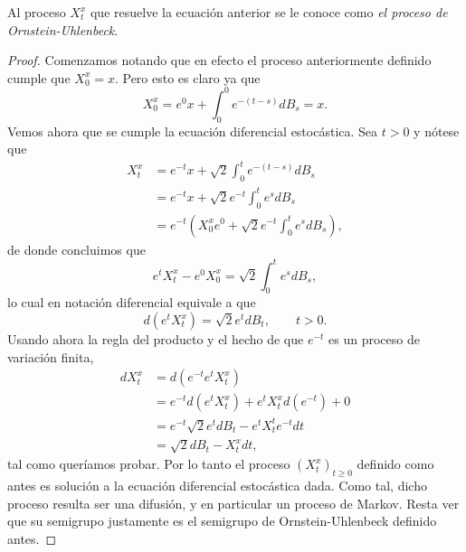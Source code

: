 \documentclass[letterpaper,twoside,12pt]{book}
\newcommand{\1}{\mathds{1}}
\theoremstyle{definition}
\theoremstyle{definition}
\theoremstyle{remark}
\theoremstyle{definition}
\theoremstyle{definition}
\theoremstyle{definition}
\theoremstyle{definition}
\theoremstyle{definition}
\begin{document}
   Al proceso $X_t^x$ que resuelve la ecuación anterior se le conoce como \textit{el proceso de Ornstein-Uhlenbeck}.
   \begin{proof} 
     Comenzamos notando que en efecto el proceso anteriormente definido cumple que $X_0^x=x$. Pero esto es claro ya que 
     \[
     X_0^x=e^{0}x+\int_{0}^{0}e^{-(t-s)}dB_s=x.
     \] 
     Vemos ahora que se cumple la ecuación diferencial estocástica. Sea $t>0$ y nótese que 
     \begin{align*}
       X_t^x&=e^{-t}x+\sqrt{2}\int_0^te^{-(t-s)}dB_s\\
       &=e^{-t}x+\sqrt{2}e^{-t}\int_0^{t}e^{s}dB_s\\
       &=e^{-t}\left(X_0^{x}e^{0}+\sqrt{2}e^{-t}\int_0^te^{s}dB_s \right),
     \end{align*}
     de donde concluimos que 
     \[
     e^{t}X_t^x-e^{0}X_0^x=\sqrt{2}\int_{0}^{t}e^{s}dB_s,
     \]
     lo cual en notación diferencial equivale a que 
     \[
     d \left(e^tX_t^x\right)=\sqrt{2}e^{t}dB_t,  \qquad t>0.
     \]
     Usando ahora la regla del producto y el hecho de que $e^{-t}$ es un proceso de variación finita,  
     \begin{align*}
       dX_t^{x}&=d(e^{-t}e^{t}X_t^{x})\\
       &=e^{-t}d(e^{t}X_t^{x})+e^{t}X_t^{x}d(e^{-t})+0\\
       &=e^{-t}\sqrt{2}e^{t}dB_t-e^{t}X_t^{t}e^{-t}dt\\
       &=\sqrt{2}dB_t-X_t^xdt,
     \end{align*}
     tal como queríamos probar. Por lo tanto el proceso $(X_t^x)_{t\geq0}$ definido como antes es solución a la ecuación diferencial estocástica dada. Como tal, dicho proceso resulta ser una difusión, y en particular un proceso de Markov. Resta ver que su semigrupo justamente es el semigrupo de Ornstein-Uhlenbeck definido antes.


\end{proof}
\end{document}
